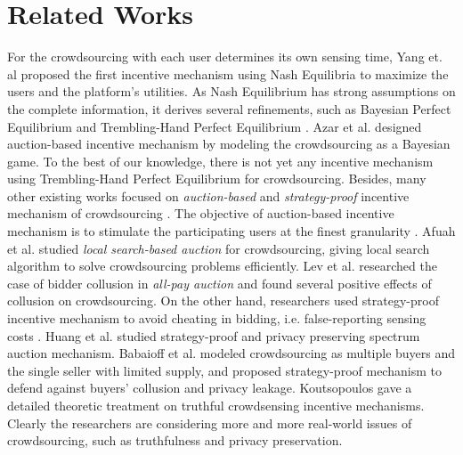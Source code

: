 \documentclass{IEEEtran}
\begin{document}
\section{Related Works}
\label{sec:related_work}
For the crowdsourcing with each user determines its own sensing time, Yang et. al \cite{yang:crowdsourcing} proposed the first incentive mechanism using Nash Equilibria to maximize the users and the platform's utilities. As Nash Equilibrium has strong assumptions on the complete information, it derives several refinements, such as Bayesian Perfect Equilibrium \cite{harsanyi:bayesian} and Trembling-Hand Perfect Equilibrium \cite{selten:te}\cite{van1997games}\cite{wolpert2009trembling}\cite{mittal2011trembling}. Azar et al. \cite{azar:bayesian} designed auction-based incentive mechanism by modeling the crowdsourcing as a Bayesian game. To the best of our knowledge, there is not yet any incentive mechanism using Trembling-Hand Perfect Equilibrium for crowdsourcing. Besides, many other existing works focused on \emph{auction-based} and \emph{strategy-proof} incentive mechanism of crowdsourcing \cite{satzger:market_auction} \cite{afuah:local_search} \cite{lev:all_pay_auction} \cite{huang:strategy_proof} \cite{babaioff:strategy_proof} \cite{koutsopoulos2013optimal}. The objective of auction-based incentive mechanism is to stimulate the participating users at the finest granularity \cite{satzger:market_auction}. Afuah et al. \cite{afuah:local_search} studied \emph{local search-based auction} for crowdsourcing, giving local search algorithm to solve crowdsourcing problems efficiently. Lev et al. \cite{lev:all_pay_auction} researched the case of bidder collusion in \emph{all-pay auction} and found several positive effects of collusion on crowdsourcing. On the other hand, researchers used strategy-proof incentive mechanism to avoid cheating in bidding, i.e. false-reporting sensing costs \cite{feng:imac}. Huang et al. \cite{huang:strategy_proof} studied strategy-proof and privacy preserving spectrum auction mechanism. Babaioff et al. \cite{babaioff:strategy_proof} modeled crowdsourcing as multiple buyers and the single seller with limited supply, and proposed strategy-proof mechanism to defend against buyers' collusion and privacy leakage. Koutsopoulos \cite{koutsopoulos2013optimal} gave a detailed theoretic treatment on truthful crowdsensing incentive mechanisms. Clearly the researchers are considering more and more real-world issues of crowdsourcing, such as truthfulness and privacy preservation.
\end{document}
